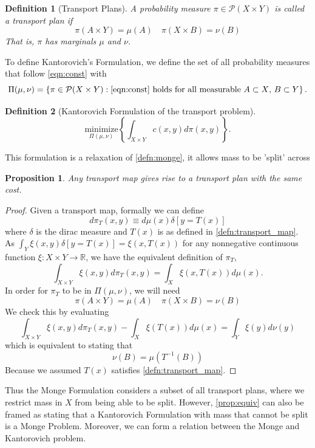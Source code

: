 \documentclass[12pt]{article}
\theoremstyle{plain}
\newtheorem{prop}{Proposition}[section]
\newtheorem{defn}{Definition}[section]
\numberwithin{equation}{section}
\begin{document}
\begin{defn}[Transport Plans]
  A probability measure $\pi\in\mathcal{P}(X\times Y)$ is called a transport plan if 
  \begin{equation}\label{eqn:const}
    \pi(A\times Y) = \mu(A)\quad \pi(X\times B) = \nu(B)
  \end{equation}
  That is, $\pi$ has marginals $\mu$ and $\nu$.
\end{defn}
To define  Kantorovich's Formulation, we define the set of all probability measures that follow \autoref{eqn:const} with
\begin{equation}
  \Pi(\mu,\nu) = \left\{\pi\in \mathcal{P}(X\times Y): \text{\autoref{eqn:const} holds for all measurable $A\subset X$, $B\subset Y$}\right\}.
\end{equation}
\begin{defn}[Kantorovich Formulation of the transport problem]\label{defn:kantorovich}
  \begin{equation}
    \underset{\Pi(\mu,\nu)}{\text{minimize}}\left\{\int_{X\times Y} c(x,y)d\pi(x,y)\right\}.
  \end{equation}
\end{defn}
This formulation is a relaxation of \autoref{defn:monge}, it allows mass to be 'split' across 
\begin{prop}\label{prop:equiv}
  Any transport map gives rise to a transport plan with the same cost.
\end{prop}
\begin{proof}
  Given a transport map, formally we can define
  \[d\pi_T(x,y) \equiv d\mu(x)\delta[y=T(x)]\]
  where $\delta$ is the dirac measure and $T(x)$ is as defined in \autoref{defn:transport_map}. As $\int_Y\xi(x,y)\delta[y=T(x)] = \xi(x,T(x))$ for any nonnegative continuous function $\xi:X\times Y\to \mathbb{R}$, we have the equivalent definition of $\pi_T$, 
  \[ \int_{X\times Y}\xi(x,y)d\pi_T(x,y) = \int_X \xi(x,T(x))d\mu(x).\]
  In order for $\pi_T$ to be in $\Pi(\mu,\nu)$, we will need
  \[\pi(A\times Y) = \mu(A)\quad \pi(X \times B) = \nu(B)\]
  We check this by evaluating 
  \[ \int_{X\times Y} \xi(x,y)d\pi_T(x,y) - \int_X\xi(T(x))d\mu(x) = \int_Y\xi(y)d\nu(y)\]
  which is equivalent to stating that 
  \[\nu(B) = \mu(T^{-1}(B))\]
  Because we assumed $T(x)$ satisfies \autoref{defn:transport_map}.
\end{proof}
Thus the Monge Formulation considers a subset of all transport plans, where we restrict mass in $X$ from being able to be split. However, \autoref{prop:equiv} can also be framed as stating that a Kantorovich Formulation with mass
that cannot be split is a Monge Problem. Moreover, we can form a relation between the Monge and Kantorovich problem.
\end{document}
